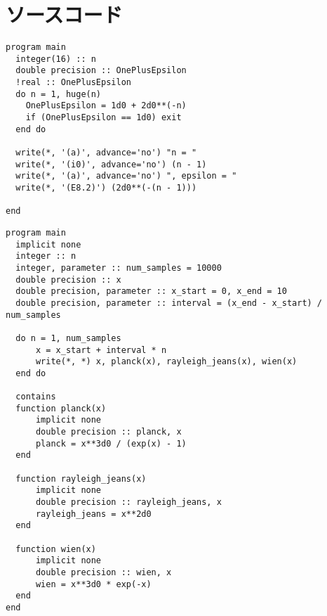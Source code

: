 \appendix
\renewcommand{\lstlistingname}{ソースコード}
\renewcommand*{\thelstlisting}{\Alph{section}.\arabic{lstlisting}}
\section{ソースコード}
\begin{lstlisting}[caption=2-Aのソースコード,label=src2a]
program main
  integer(16) :: n
  double precision :: OnePlusEpsilon
  !real :: OnePlusEpsilon
  do n = 1, huge(n)
    OnePlusEpsilon = 1d0 + 2d0**(-n)
    if (OnePlusEpsilon == 1d0) exit
  end do
  
  write(*, '(a)', advance='no') "n = "
  write(*, '(i0)', advance='no') (n - 1)
  write(*, '(a)', advance='no') ", epsilon = "
  write(*, '(E8.2)') (2d0**(-(n - 1)))

end
\end{lstlisting}
\clearpage
\begin{lstlisting}[caption=2-Bのソースコード,label=src2b]
program main
  implicit none
  integer :: n
  integer, parameter :: num_samples = 10000
  double precision :: x
  double precision, parameter :: x_start = 0, x_end = 10
  double precision, parameter :: interval = (x_end - x_start) / num_samples

  do n = 1, num_samples
      x = x_start + interval * n
      write(*, *) x, planck(x), rayleigh_jeans(x), wien(x)
  end do
  
  contains
  function planck(x)
      implicit none
      double precision :: planck, x
      planck = x**3d0 / (exp(x) - 1)
  end
  
  function rayleigh_jeans(x)
      implicit none
      double precision :: rayleigh_jeans, x
      rayleigh_jeans = x**2d0
  end
  
  function wien(x)
      implicit none
      double precision :: wien, x
      wien = x**3d0 * exp(-x)
  end
end
\end{lstlisting}
\clearpage
